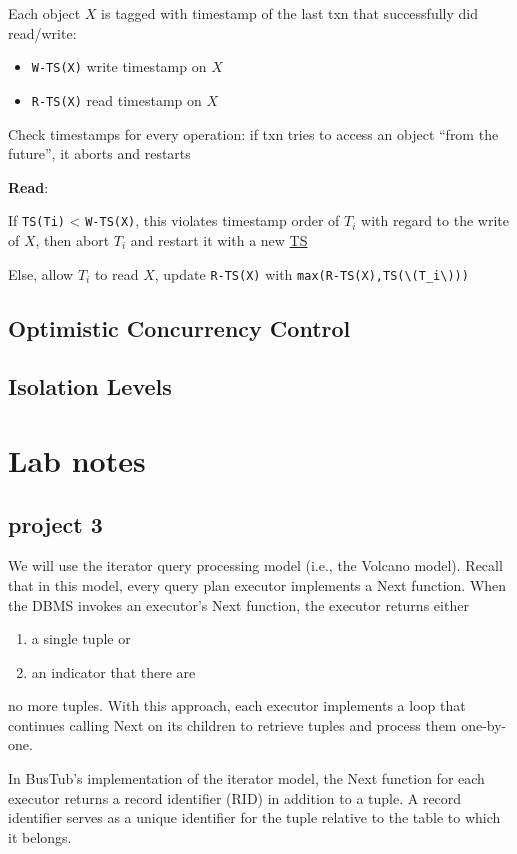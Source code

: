 \documentclass[11pt]{article}
\begin{document}
Each object \(X\) is tagged with timestamp of the last txn that successfully did read/write:
\begin{itemize}
\item \texttt{W-TS(X)} write timestamp on \(X\)
\item \texttt{R-TS(X)} read timestamp on \(X\)
\end{itemize}

Check timestamps for every operation: if txn tries to access an object ``from the future'', it
aborts and restarts

\textbf{Read}:

If \texttt{TS(Ti)} < \texttt{W-TS(X)}, this violates timestamp order of \(T_i\) with regard to the write of \(X\),
then abort \(T_i\) and restart it with a new \uline{TS}

Else, allow \(T_i\) to read \(X\), update \texttt{R-TS(X)} with \texttt{max(R-TS(X),TS(\textbackslash{}(T\_i\textbackslash{})))}

\subsection{Optimistic Concurrency Control}
\label{sec:orga2db8b4}
\subsection{Isolation Levels}
\label{sec:org4acca6b}

\section{Lab notes}
\label{sec:org36b0bab}
\subsection{project 3}
\label{sec:org9c22bf9}
We will use the iterator query processing model (i.e., the Volcano model). Recall that in this
model, every query plan executor implements a Next function. When the DBMS invokes an executor's
Next function, the executor returns either
\begin{enumerate}
\item a single tuple or
\item an indicator that there are
\end{enumerate}
no more tuples. With this approach, each executor implements a loop that continues calling Next
on its children to retrieve tuples and process them one-by-one.

In BusTub's implementation of the iterator model, the Next function for each executor returns a
record identifier (RID) in addition to a tuple. A record identifier serves as a unique
identifier for the tuple relative to the table to which it belongs.
\end{document}
